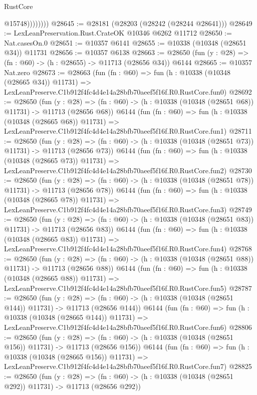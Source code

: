 \begin{lexlean}{RustCore}
\begin{coremodule}
                    @15748))))))))
@28645 := @28181 (@28203 (@28242 (@28244 @28641)))
@28649 := LexLeanPreservation.Rust.CrateOK @10346 @6262 @11712
@28650 := Nat.casesOn.{0}
@28651 := @10357 @6141
@28655 := @10338 (@10348 (@28651 @34)) @11731
@28656 := @10357 @6138
@28663 := @28650 (fun (y : @28) => (fn : @60) -> (h : @28655) -> @11713 (@28656 @34)) @6144
@28665 := @10357 Nat.zero
@28673 := @28663
    (fun (fn : @60) =>
    fun (h : @10338 (@10348 (@28665 @34)) @11731) =>
    LexLeanPreserve.C1b912f4fc4d4e14a28bfb70aeef5f16f.R0.RustCore.fun0)
@28692 := @28650
    (fun (y : @28) =>
    (fn : @60) -> (h : @10338 (@10348 (@28651 @68)) @11731) -> @11713 (@28656 @68))
    @6144
    (fun (fn : @60) =>
    fun (h : @10338 (@10348 (@28665 @68)) @11731) =>
    LexLeanPreserve.C1b912f4fc4d4e14a28bfb70aeef5f16f.R0.RustCore.fun1)
@28711 := @28650
    (fun (y : @28) =>
    (fn : @60) -> (h : @10338 (@10348 (@28651 @73)) @11731) -> @11713 (@28656 @73))
    @6144
    (fun (fn : @60) =>
    fun (h : @10338 (@10348 (@28665 @73)) @11731) =>
    LexLeanPreserve.C1b912f4fc4d4e14a28bfb70aeef5f16f.R0.RustCore.fun2)
@28730 := @28650
    (fun (y : @28) =>
    (fn : @60) -> (h : @10338 (@10348 (@28651 @78)) @11731) -> @11713 (@28656 @78))
    @6144
    (fun (fn : @60) =>
    fun (h : @10338 (@10348 (@28665 @78)) @11731) =>
    LexLeanPreserve.C1b912f4fc4d4e14a28bfb70aeef5f16f.R0.RustCore.fun3)
@28749 := @28650
    (fun (y : @28) =>
    (fn : @60) -> (h : @10338 (@10348 (@28651 @83)) @11731) -> @11713 (@28656 @83))
    @6144
    (fun (fn : @60) =>
    fun (h : @10338 (@10348 (@28665 @83)) @11731) =>
    LexLeanPreserve.C1b912f4fc4d4e14a28bfb70aeef5f16f.R0.RustCore.fun4)
@28768 := @28650
    (fun (y : @28) =>
    (fn : @60) -> (h : @10338 (@10348 (@28651 @88)) @11731) -> @11713 (@28656 @88))
    @6144
    (fun (fn : @60) =>
    fun (h : @10338 (@10348 (@28665 @88)) @11731) =>
    LexLeanPreserve.C1b912f4fc4d4e14a28bfb70aeef5f16f.R0.RustCore.fun5)
@28787 := @28650
    (fun (y : @28) =>
    (fn : @60) -> (h : @10338 (@10348 (@28651 @144)) @11731) -> @11713 (@28656 @144))
    @6144
    (fun (fn : @60) =>
    fun (h : @10338 (@10348 (@28665 @144)) @11731) =>
    LexLeanPreserve.C1b912f4fc4d4e14a28bfb70aeef5f16f.R0.RustCore.fun6)
@28806 := @28650
    (fun (y : @28) =>
    (fn : @60) -> (h : @10338 (@10348 (@28651 @156)) @11731) -> @11713 (@28656 @156))
    @6144
    (fun (fn : @60) =>
    fun (h : @10338 (@10348 (@28665 @156)) @11731) =>
    LexLeanPreserve.C1b912f4fc4d4e14a28bfb70aeef5f16f.R0.RustCore.fun7)
@28825 := @28650
    (fun (y : @28) =>
    (fn : @60) -> (h : @10338 (@10348 (@28651 @292)) @11731) -> @11713 (@28656 @292))

\end{coremodule}
\end{lexlean}
